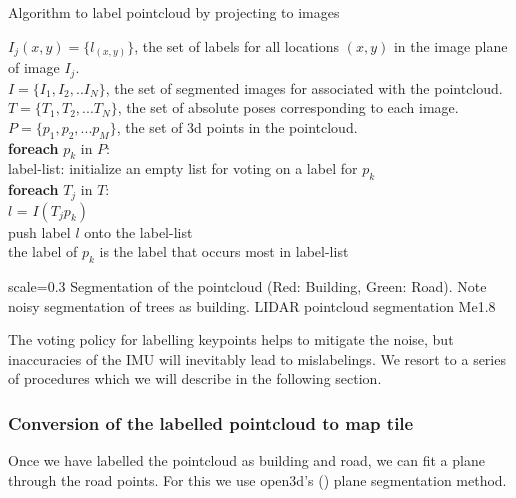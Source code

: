 \begin{algorithm}
\caption{Algorithm to label pointcloud by projecting to images}
\begin{algorithmic}
\REQUIRE $I_j(x,y) = \{l_{(x,y)}\}$, the set of labels for all locations $(x,y)$ in the image plane of image $I_j$.\\
$I = \{I_1, I_2,..I_N\}$, the set of segmented images for associated with the pointcloud.\\
$T = \{T_1, T_2,...T_N\}$, the set of absolute poses corresponding to each image.\\
$P = \{p_1, p_2, ...p_M\}$, the set of 3d points in the pointcloud. \\
\vspace{5 mm}
\textbf{foreach} $p_k$ in $P$:\\
   
   \hspace{5 mm} label-list: initialize an empty list for voting on a label for $p_k$\\
    \hspace{5 mm}\textbf{foreach} $T_j$ in $T$:\\
      \hspace{5 mm}\hspace{5 mm}$l$ = $I(T_j p_k)$\\
      \hspace{5 mm}\hspace{5 mm}push label $l$ onto the label-list\\
the label of $p_k$ is the label that occurs most in label-list\\
\end{algorithmic}
\end{algorithm}

{scale=0.3}%
{Segmentation of the pointcloud (Red: Building, Green: Road). Note noisy segmentation of trees as building.}%
{LIDAR pointcloud segmentation}%
{Me1.8}

The voting policy for labelling keypoints helps to mitigate the noise, but inaccuracies of the IMU will inevitably lead to mislabelings. We resort to a series of procedures which we will describe in the following section.

\subsubsection{Conversion of the labelled pointcloud to map tile}
Once we have labelled the pointcloud as building and road, we can fit a plane through the road points. For this we use open3d's (\cite{zhou2018}) plane segmentation method.

